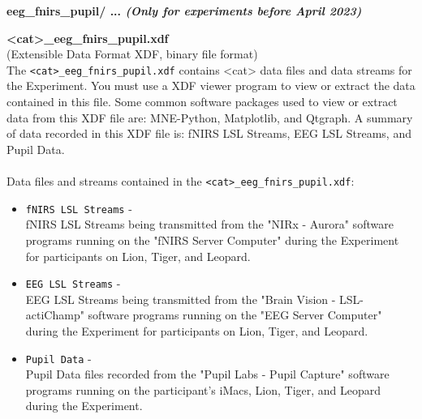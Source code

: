 \begin{description}
\begin{addmargin}[0em]{0em} %
    \textbf{eeg\_fnirs\_pupil/ ... \textit{(Only for experiments before April 2023)}}

    \begin{addmargin}[1em]{0em} %
        \label{<cat>_eeg_fnirs_pupil.xdf}
        \textbf{<cat>\_eeg\_fnirs\_pupil.xdf}\\
        (Extensible Data Format XDF, binary file format)\\
        The \verb|<cat>_eeg_fnirs_pupil.xdf| contains <cat> data files and data streams for the Experiment.
        You must use a XDF viewer program to view or extract the data contained in this file.
        Some common software packages used to view or extract data from this XDF file are: MNE-Python, Matplotlib, and Qtgraph.
        A summary of data recorded in this XDF file is: fNIRS LSL Streams, EEG LSL Streams, and Pupil Data.\\\\
        Data files and streams contained in the \verb|<cat>_eeg_fnirs_pupil.xdf|:
        \begin{itemize}
            \item \verb|fNIRS LSL Streams| -\\fNIRS LSL Streams being transmitted from the "NIRx - Aurora" software programs running on the "fNIRS Server Computer" during the Experiment for participants on Lion, Tiger, and Leopard.
            \item \verb|EEG LSL Streams| -\\EEG LSL Streams being transmitted from the "Brain Vision - LSL-actiChamp" software programs running on the "EEG Server Computer" during the Experiment for participants on Lion, Tiger, and Leopard.
            \item \verb|Pupil Data| -\\Pupil Data files recorded from the "Pupil Labs - Pupil Capture" software programs running on the participant's iMacs, Lion, Tiger, and Leopard during the Experiment.
        \end{itemize}
    \end{addmargin} %

\end{addmargin} %


\end{description}
